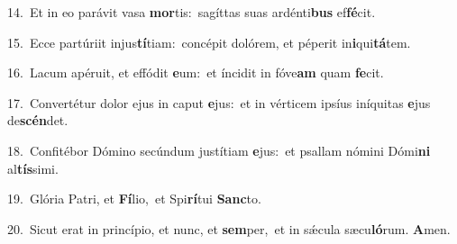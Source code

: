 {\numbfont\textcolor{\numbcolor}{14.}}~Et in eo parávit vasa \textbf{mor}\-tis:~\star sagíttas suas ardénti\textbf{bus} ef\-\textbf{fé}\-cit.\par
{\numbfont\textcolor{\numbcolor}{15.}}~Ecce partúriit injus\-\textbf{tí}\-tiam:~\star concépit dolórem, et péperit in\-\textbf{i}\-qui\-\textbf{tá}\-tem.\par
{\numbfont\textcolor{\numbcolor}{16.}}~Lacum apéruit, et effódit \textbf{e}\-um:~\star et íncidit in fóve\textbf{am} quam \textbf{fe}\-cit.\par
{\numbfont\textcolor{\numbcolor}{17.}}~Convertétur dolor ejus in caput \textbf{e}\-jus:~\star et in vérticem ipsíus iníquitas \textbf{e}\-jus de\-\textbf{scén}\-det.\par
{\numbfont\textcolor{\numbcolor}{18.}}~Confitébor Dómino secúndum justítiam \textbf{e}\-jus:~\star et psallam nómini Dómi\textbf{ni} al\-\textbf{tís}\-simi.\par
{\numbfont\textcolor{\numbcolor}{19.}}~Glória Patri, et \textbf{Fí}\-lio,~\star et Spi\-\textbf{rí}\-tui \textbf{Sanc}\-to.\par
{\numbfont\textcolor{\numbcolor}{20.}}~Sicut erat in princípio, et nunc, et \textbf{sem}\-per,~\star et in sǽcula sæcu\-\textbf{ló}\-rum. \textbf{A}\-men.\par
